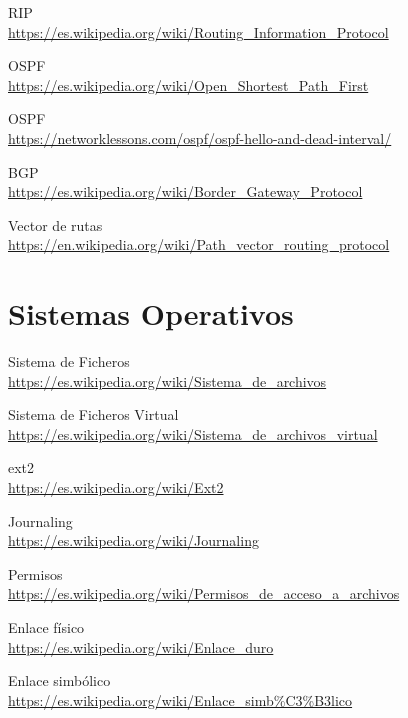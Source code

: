 \begin{thebibliography}{9}
\bibitem{} 
RIP
\\\url{https://es.wikipedia.org/wiki/Routing\_Information\_Protocol}

\bibitem{} 
OSPF
\\\url{https://es.wikipedia.org/wiki/Open\_Shortest\_Path\_First}

\bibitem{} 
OSPF
\\\url{https://networklessons.com/ospf/ospf-hello-and-dead-interval/}

\bibitem{} 
BGP
\\\url{https://es.wikipedia.org/wiki/Border\_Gateway\_Protocol}

\bibitem{} 
Vector de rutas
\\\url{https://en.wikipedia.org/wiki/Path\_vector\_routing\_protocol}
\section*{Sistemas Operativos}
\bibitem{} 
Sistema de Ficheros
\\\url{https://es.wikipedia.org/wiki/Sistema\_de\_archivos}

\bibitem{} 
Sistema de Ficheros Virtual
\\\url{https://es.wikipedia.org/wiki/Sistema\_de\_archivos\_virtual}

\bibitem{} 
ext2
\\\url{https://es.wikipedia.org/wiki/Ext2}

\bibitem{} 
Journaling
\\\url{https://es.wikipedia.org/wiki/Journaling}

\bibitem{} 
Permisos
\\\url{https://es.wikipedia.org/wiki/Permisos\_de\_acceso\_a\_archivos}

\bibitem{} 
Enlace físico
\\\url{https://es.wikipedia.org/wiki/Enlace\_duro}

\bibitem{} 
Enlace simbólico
\\\url{https://es.wikipedia.org/wiki/Enlace_simb\%C3\%B3lico}


\end{thebibliography}
